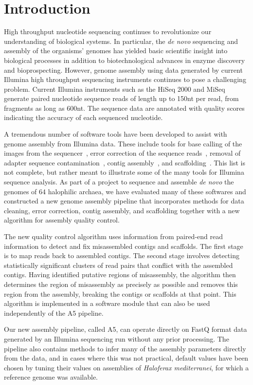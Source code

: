 \documentclass{bioinfo}
\begin{document}
\section{Introduction}
High throughput nucleotide sequencing continues to revolutionize our understanding of biological systems. In particular,
the \textit{de novo} sequencing and assembly of the organisms' genomes has yielded basic scientific insight into biological processes
in addition to biotechnological advances in enzyme discovery and bioprospecting.  However,
genome assembly using data generated by current Illumina high throughput sequencing instruments continues to pose a 
challenging problem. Current Illumina instruments such as the HiSeq 2000 and MiSeq generate paired nucleotide 
sequence reads of length up to 150nt per read, from fragments as long as 600nt. The sequence data are annotated with
quality scores indicating the accuracy of each sequenced nucleotide.

A tremendous number of software tools have been developed to assist with genome assembly from Illumina data.
These include tools for base calling of the images from the sequencer~\citep{bayescall,ibis},
error correction of the sequence reads~\citep{quake,shrec}, removal of adapter sequence contamination~\citep{tagdust},
contig assembly~\citep{vcake,euler-sr}, and scaffolding~\citep{bambus2,Boetzer2011,SOPRA}.
This list is not complete, but rather meant to illustrate some of the many tools for Illumina sequence analysis.
As part of a project to sequence and assemble \textit{de novo} the genomes of 64 halophilic archaea, we have
evaluated many of these softwares and constructed a new genome assembly pipeline that incorporates
methods for data cleaning, error correction, contig assembly, and scaffolding together with a new algorithm
for assembly quality control. 

The new quality control algorithm uses information from paired-end read information
to detect and fix misassembled contigs and scaffolds. The first stage is to map reads back to assembled contigs.
The second stage involves detecting statistically significant clusters of read pairs that conflict with the
assembled contigs. Having identified putative regions of misassembly, the algorithm then determines the 
region of misassembly as precisely as possible and removes this region from the assembly, breaking the contigs
or scaffolds at that point. This algorithm is implemented in a software module that can also be used 
independently of the A5 pipeline.

Our new assembly pipeline, called A5, can operate directly on FastQ format data generated by an Illumina sequencing run
without any prior processing. The pipeline also contains methods to infer many of the assembly parameters directly
from the data, and in cases where this was not practical, default values have been chosen by tuning their values on 
assemblies of \textit{Haloferax mediterranei}, for which a reference genome was available.
\end{document}
